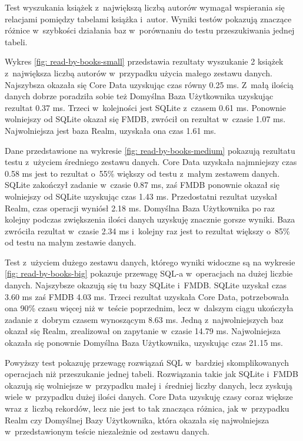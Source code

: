 Test wyszukania książek z~największą liczbą autorów wymagał wspierania się relacjami pomiędzy tabelami książka i~autor. Wyniki testów pokazują znaczące różnice w~szybkości działania baz w~porównaniu do testu przeszukiwania jednej tabeli. 

Wykres \ref{fig: read-by-books-small} przedstawia rezultaty wyszukanie 2 książek z~największa liczbą autorów w~przypadku użycia małego zestawu danych. Najszybsza okazała się Core Data uzyskując czas równy 0.25 ms. Z~małą ilością danych dobrze poradziła sobie też Domyślna Baza Użytkownika uzyskując rezultat 0.37 ms. Trzeci w~kolejności jest SQLite z~czasem 0.61 ms. Ponownie wolniejszy od SQLite okazał się FMDB, zwrócił on rezultat w~czasie 1.07 ms. Najwolniejsza jest baza Realm, uzyskała ona czas 1.61 ms.

Dane przedstawione na wykresie \ref{fig: read-by-books-medium} pokazują rezultatu testu z~użyciem średniego zestawu danych. Core Data uzyskała najmniejszy czas 0.58 ms jest to rezultat o~55\% większy od testu z~małym zestawem danych. SQLite zakończył zadanie w~czasie 0.87 ms, zaś FMDB ponownie okazał się wolniejszy od SQLite uzyskując czas 1.43 ms. Przedostatni rezultat uzyskał Realm, czas operacji wyniósł 2.18 ms. Domyślna Baza Użytkownika po raz kolejny podczas zwiększenia ilości danych uzyskuję znacznie gorsze wyniki. Baza zwróciła rezultat w~czasie 2.34 ms i~kolejny raz jest to rezultat większy o~85\% od testu na małym zestawie danych. 

Test z~użyciem dużego zestawu danych, którego wyniki widoczne są na wykresie \ref{fig: read-by-books-big} pokazuje przewagę SQL-a w~operacjach na dużej liczbie danych. Najszybsze okazują się tu bazy SQLite i~FMDB. SQLite uzyskał czas 3.60 ms zaś FMDB 4.03 ms. Trzeci rezultat uzyskała Core Data, potrzebowała ona 90\% czasu więcej niż w~teście poprzednim, lecz w~dalszym ciągu ukończyła zadanie z~dobrym czasem wynoszącym 8.63 ms. Jedną z~najwolniejszych baz okazał się Realm, zrealizował on zapytanie w~czasie 14.79 ms. Najwolniejsza okazała się ponownie Domyślna Baza Użytkownika, uzyskując czas 21.15 ms. 

Powyższy test pokazuję przewagę rozwiązań SQL w~bardziej skomplikowanych operacjach niż przeszukanie jednej tabeli. Rozwiązania takie jak SQLite i~FMDB okazują się wolniejsze w~przypadku małej i~średniej liczby danych, lecz zyskują wiele w~przypadku dużej ilości danych. Core Data uzyskuję czasy coraz większe wraz z~liczbą rekordów, lecz nie jest to tak znacząca różnica, jak w~przypadku Realm czy Domyślnej Bazy Użytkownika, która okazała się najwolniejsza w~przedstawionym teście niezależnie od zestawu danych. 

